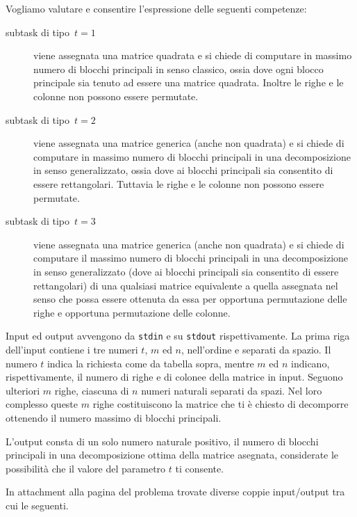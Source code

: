 Vogliamo valutare e consentire l'espressione delle seguenti competenze:
\begin{description}
\item[subtask di tipo~$t=1$] viene assegnata una matrice quadrata e si chiede di computare in massimo numero di blocchi principali in senso classico, ossia dove ogni blocco principale sia tenuto ad essere una matrice quadrata. Inoltre le righe e le colonne non possono essere permutate.
\item[subtask di tipo~$t=2$] viene assegnata una matrice generica (anche non quadrata) e si chiede di computare in massimo numero di blocchi principali in una decomposizione in senso generalizzato, ossia dove ai blocchi principali sia consentito di essere rettangolari. Tuttavia le righe e le colonne non possono essere permutate.
\item[subtask di tipo~$t=3$] viene assegnata una matrice generica (anche non quadrata) e si chiede di computare il massimo numero di blocchi principali in una decomposizione in senso generalizzato (dove ai blocchi principali sia consentito di essere rettangolari) di una qualsiasi matrice equivalente a quella assegnata nel senso che possa essere ottenuta da essa per opportuna permutazione delle righe e opportuna permutazione delle colonne. 
\end{description}



Input ed output avvengono da \verb'stdin' e su \verb'stdout' rispettivamente.
La prima riga dell'input contiene i tre numeri $t$, $m$ ed $n$, nell'ordine e separati da spazio. Il numero $t$ indica la richiesta come da tabella sopra, mentre $m$ ed $n$ indicano, rispettivamente, il numero di righe e di colonee della matrice in input.
Seguono ulteriori $m$ righe, ciascuna di $n$ numeri naturali separati da spazi. Nel loro complesso queste $m$ righe costituiscono la matrice che ti è chiesto di decomporre ottenendo il numero massimo di blocchi principali.

\indent
L'output consta di un solo numero naturale positivo, il numero di blocchi principali in una decomposizione ottima della matrice asegnata, considerate le possibilità che il valore del parametro $t$ ti consente.


In attachment alla pagina del problema trovate diverse coppie input/output tra cui le seguenti.

\vspace{0.5cm}


